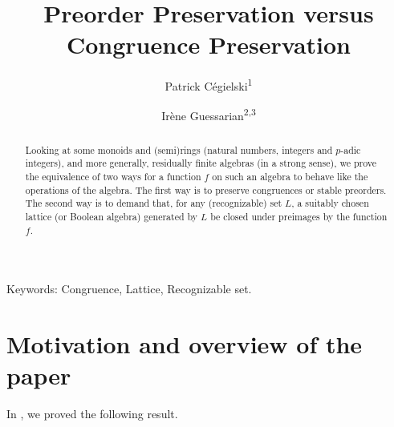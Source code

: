 \documentclass[11pt,a4paper]{article}
\theoremstyle{definition} %
\newcommand\+[1]{\mathcal{#1}} %
\begin{document}
\setlength{\itemsep}{0pt}
\renewcommand\contentsname{\large \normalfont Title: \bf
Congruence Preservation, Lattices and Recognizability}
\newpage
\title {Preorder Preservation versus Congruence Preservation}
\author{
{Patrick C\'egielski\textsuperscript{1}}
\and 
{Ir\`ene  Guessarian\textsuperscript{2,3}}
}
\maketitle



\maketitle
\begin{center}

\end{center}

\begin{abstract} Looking at some monoids and (semi)rings (natural numbers, integers and $p$-adic integers),
and more generally, residually finite algebras (in a strong sense),
we prove  the equivalence of two ways for a function $f$ on such an algebra to behave like the operations of the algebra. The
first way is to preserve congruences or stable preorders.
The second way is to demand that, for any (recognizable) set $L$, a suitably chosen lattice 
(or Boolean algebra) generated by $L$ be closed under preimages by the function $f$.  
\end{abstract}

Keywords: Congruence, Lattice,  Recognizable set.



\section{Motivation and overview of the paper} 
\label{s:intro}
%
%
In \cite{cgg14ipl}, 
we proved the following result.
\end{document}

